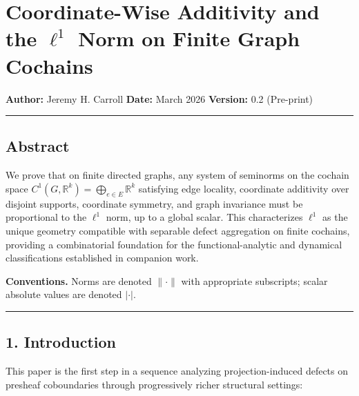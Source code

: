 \documentclass[
]{article}
\author{}
\date{}
\begin{document}
\section{\texorpdfstring{Coordinate-Wise Additivity and the \(\ell^1\)
Norm on Finite Graph
Cochains}{Coordinate-Wise Additivity and the \textbackslash ell\^{}1 Norm on Finite Graph Cochains}}\label{coordinate-wise-additivity-and-the-ell1-norm-on-finite-graph-cochains}

\textbf{Author:} Jeremy H. Carroll \textbf{Date:} March 2026
\textbf{Version:} 0.2 (Pre-print)

\begin{center}\rule{0.5\linewidth}{0.5pt}\end{center}

\subsection{Abstract}\label{abstract}

We prove that on finite directed graphs, any system of seminorms on the
cochain space
\(C^1(G, \mathbb{R}^k) = \bigoplus_{e \in E} \mathbb{R}^k\) satisfying
edge locality, coordinate additivity over disjoint supports, coordinate
symmetry, and graph invariance must be proportional to the \(\ell^1\)
norm, up to a global scalar. This characterizes \(\ell^1\) as the unique
geometry compatible with separable defect aggregation on finite
cochains, providing a combinatorial foundation for the
functional-analytic and dynamical classifications established in
companion work.

\textbf{Conventions.} Norms are denoted \(\lVert \cdot \rVert\) with
appropriate subscripts; scalar absolute values are denoted \(|\cdot|\).

\begin{center}\rule{0.5\linewidth}{0.5pt}\end{center}

\subsection{1. Introduction}\label{introduction}

This paper is the first step in a sequence analyzing projection-induced
defects on presheaf coboundaries through progressively richer structural
settings:
\end{document}

